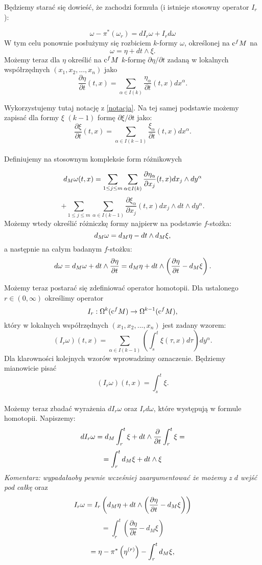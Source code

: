 \documentclass[licencjacka]{pracamgr}
\theoremstyle{definition}
\theoremstyle{definition}
\theoremstyle{plain}
\theoremstyle{plain}
\theoremstyle{plain}
\theoremstyle{plain}
\def\cfm{\ensuremath\mathrm{c}^fM}
\def\M{\ensuremath M}
\begin{document}
Będziemy starać się dowieść, że zachodzi formuła (i istnieje stosowny operator 
$I_r$):

\[
    \omega - \pi^\ast(\omega_r) = dI_r \omega + I_r d\omega
\]
W tym celu ponownie posłużymy się rozbiciem $k$-formy $\omega$, określonej na
$\cfm$ na
\[
    \omega = \eta + dt \wedge \xi.
\] 
Możemy teraz dla $\eta$ określić na $\cfm$ $k$-formę $\partial \eta / \partial
t$ zadaną w lokalnych współrzędnych $(x_1, x_2, ..., x_n)$ jako
\[
    \frac{\partial \eta}{\partial t} (t, x) =
    \sum_{\alpha \in I(k)} \frac{\eta_\alpha}{\partial t}(t, x) dx^\alpha.
\]

Wykorzystujemy tutaj notację z \ref{notacja}. Na tej samej podstawie możemy 
zapisać dla formy $\xi$ $(k-1)$ formę $\partial \xi / \partial t$ jako:
\[
    \frac{\partial \xi}{\partial t} (t, x) =
    \sum_{\alpha \in I(k-1)} \frac{\xi_\alpha}{\partial t}(t, x) dx^\alpha. 
\] \\

Definiujemy na stosownym kompleksie form różnikowych

\[
    d_\M \omega(t, x) =  
    \sum_{1 \leq j \leq m} \sum_{\alpha \in I(k)}
    \frac{\partial \eta_\alpha}{\partial x_j}(t, x) dx_j \wedge dy^\alpha
\]
\[
    + \sum_{1 \leq j \leq m} \sum_{\alpha \in I(k-1)}
    \frac{\partial \xi_\alpha}{\partial x_j}(t, x) dx_j \wedge dt \wedge dy^\alpha.
\]
Możemy wtedy określić różniczkę formy najpierw na podstawie $f$-stożka:
\[
    d_\M \omega = d_\M \eta - dt \wedge d_\M \xi,
\]
a następnie na całym badanym $f$-stożku:
\[
    d \omega = 
    d_\M \omega + dt \wedge \frac{\partial \eta}{\partial t} = 
    d_\M \eta + dt \wedge \left( 
        \frac{\partial \eta}{\partial t} - d_\M \xi
    \right). \\
\]

Możemy teraz postarać się zdefiniować operator homotopii.
Dla ustalonego $r \in (0, \infty)$ określimy operator
\[
    I_r: \Omega^k(\cfm) \rightarrow \Omega^{k-1}(\cfm),
\]
który w lokalnych współrzędnych $(x_1, x_2, ..., x_n)$ jest zadany wzorem:
\[
    (I_r \omega)(t, x) = \sum_{\alpha \in I(k-1)}
      \left(
          \int_s^t \xi(\tau, x) d\tau 
      \right) dy^\alpha.
\] 
Dla klarowności kolejnych wzorów wprowadzimy oznaczenie. Będziemy mianowicie pisać
\[
    (I_r \omega)(t, x) = \int_s^t \xi.
\] \\

Możemy teraz zbadać wyrażenia $d I_r \omega$ oraz $I_r d \omega$, które występują
w formule homotopii. Napiszemy:
\[
    d I_r \omega = d_\M \int_r^t \xi + dt \wedge \frac{\partial}{\partial t} \int_r^t \xi =
\]
\[
    = \int_r^t d_\M \xi + dt \wedge \xi
\]
\emph{Komentarz: wypadałaoby pewnie wcześniej zaargumentować że możemy z $d$ wejść pod całkę}
oraz
\[
    I_r \omega = I_r
    \left(
        d_\M \eta + dt \wedge \left( \frac{\partial \eta}{\partial t} - d_\M \xi \right)
    \right)
\]
\[
    = \int_r^t 
        \left(
            \frac{\partial \eta}{\partial t} - d_M \xi
        \right)
\]
\[\label{vanishing-eta}
    = \eta - \pi^\ast \left( \eta^{(r)} \right) - \int_r^t d_\M \xi,
\]
\end{document}
